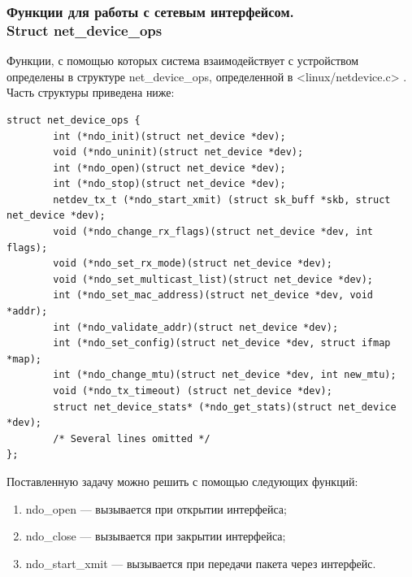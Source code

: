 \documentclass[14pt, a4paper]{extarticle}
\begin{document}
\subsubsection{Функции для работы с сетевым интерфейсом. \\ Struct net\_device\_ops}
\indent Функции, с помощью которых система взаимодействует с устройством определены в структуре net\_device\_ops, определенной в <linux/netdevice.c> \cite{netdevice}. Часть структуры приведена ниже:
\begin{lstlisting}[caption=net\_device\_ops]
struct net_device_ops {
        int (*ndo_init)(struct net_device *dev);
        void (*ndo_uninit)(struct net_device *dev);
        int (*ndo_open)(struct net_device *dev);
        int (*ndo_stop)(struct net_device *dev);
        netdev_tx_t (*ndo_start_xmit) (struct sk_buff *skb, struct net_device *dev);
        void (*ndo_change_rx_flags)(struct net_device *dev, int flags);
        void (*ndo_set_rx_mode)(struct net_device *dev);
        void (*ndo_set_multicast_list)(struct net_device *dev);
        int (*ndo_set_mac_address)(struct net_device *dev, void *addr);
        int (*ndo_validate_addr)(struct net_device *dev);
        int (*ndo_set_config)(struct net_device *dev, struct ifmap *map);
        int (*ndo_change_mtu)(struct net_device *dev, int new_mtu);
        void (*ndo_tx_timeout) (struct net_device *dev);
        struct net_device_stats* (*ndo_get_stats)(struct net_device *dev);
        /* Several lines omitted */
};
\end{lstlisting}
Поставленную задачу можно решить с помощью следующих функций:
\begin{enumerate}
	\item ndo\_open --- вызывается при открытии интерфейса;
	\item ndo\_close --- вызывается при закрытии интерфейса;
	\item ndo\_start\_xmit --- вызывается при передачи пакета через интерфейс.
\end{enumerate}
\end{document}
